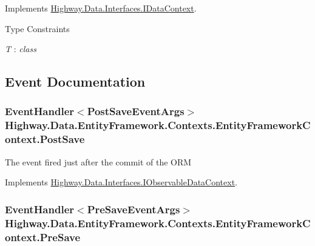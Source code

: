 Implements \hyperlink{interface_highway_1_1_data_1_1_interfaces_1_1_i_data_context_a54acc7026404f8426c0e1efe6accaf26}{Highway.\-Data.\-Interfaces.\-I\-Data\-Context}.

\begin{Desc}
\item[Type Constraints]\begin{description}
\item[{\em T} : {\em class}]\end{description}
\end{Desc}


\subsection{Event Documentation}
\hypertarget{class_highway_1_1_data_1_1_entity_framework_1_1_contexts_1_1_entity_framework_context_a2297153144a3e1240cb4526eb963b889}{
\subsubsection[{Post\-Save}]{\setlength{\rightskip}{0pt plus 5cm}Event\-Handler$<${\bf Post\-Save\-Event\-Args}$>$ Highway.\-Data.\-Entity\-Framework.\-Contexts.\-Entity\-Framework\-Context.\-Post\-Save}}\label{class_highway_1_1_data_1_1_entity_framework_1_1_contexts_1_1_entity_framework_context_a2297153144a3e1240cb4526eb963b889}


The event fired just after the commit of the O\-R\-M 



Implements \hyperlink{interface_highway_1_1_data_1_1_interfaces_1_1_i_observable_data_context_a1978b914f7b94a37a6e86f3314326ca9}{Highway.\-Data.\-Interfaces.\-I\-Observable\-Data\-Context}.

\hypertarget{class_highway_1_1_data_1_1_entity_framework_1_1_contexts_1_1_entity_framework_context_a4e307f212412dfd562cd70640d67709b}{
\subsubsection[{Pre\-Save}]{\setlength{\rightskip}{0pt plus 5cm}Event\-Handler$<${\bf Pre\-Save\-Event\-Args}$>$ Highway.\-Data.\-Entity\-Framework.\-Contexts.\-Entity\-Framework\-Context.\-Pre\-Save}}\label{class_highway_1_1_data_1_1_entity_framework_1_1_contexts_1_1_entity_framework_context_a4e307f212412dfd562cd70640d67709b}


